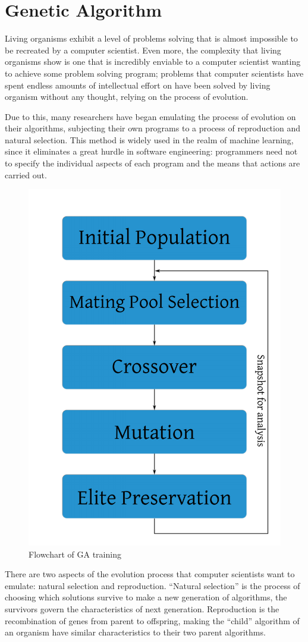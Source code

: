 \documentclass{strrespaper-trad}
\begin{document}
		\section*{Genetic Algorithm}
			Living organisms exhibit a level of problems solving that is almost impossible to be recreated by a computer scientist.
			Even more, the complexity that living organisms show is one that is incredibly enviable to a computer scientist wanting to achieve some problem solving program; problems that computer scientists have spent endless amounts of intellectual effort on have been solved by living organism without any thought, relying on the process of evolution.

			Due to this, many researchers have began emulating the process of evolution on their algorithms, subjecting their own programs to a process of reproduction and natural selection.
			This method is widely used in the realm of machine learning, since it eliminates a great hurdle in software engineering: programmers need not to specify the individual aspects of each program and the means that actions are carried out.

			\begin{figure}
				\centering
				\includegraphics[width=0.6\linewidth]{genetic}
				\caption{Flowchart of GA training}
				\label{fig:genetic}
			\end{figure}

			There are two aspects of the evolution process that computer scientists want to emulate: natural selection and reproduction. \enquote{Natural selection} is the process of choosing which solutions survive to make a new generation of algorithms, the survivors govern the characteristics of next generation. Reproduction is the recombination of genes from parent to offspring, making the \enquote{child} algorithm of an organism have similar characteristics to their two parent algorithms.
\end{document}
